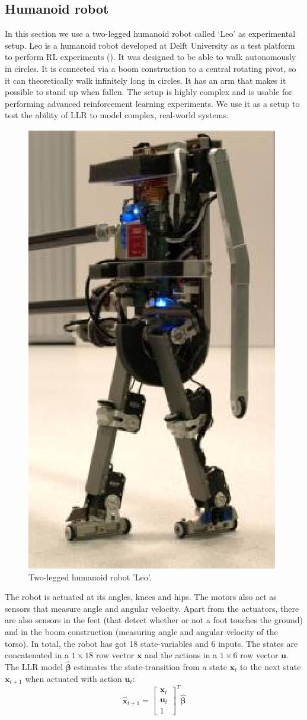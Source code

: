 \subsection{Humanoid robot}\label{sec:LLR-robot leo}
In this section we use a two-legged humanoid robot called `Leo' as experimental setup. Leo is a humanoid robot developed at Delft University as a test platform to perform \ac{RL} experiments (). It was designed to be able to walk autonomously in circles. It is connected via a boom construction to a central rotating pivot, so it can theoretically walk infinitely long in circles. It has an arm that makes it possible to stand up when fallen. The setup is highly complex and is usable for performing advanced reinforcement learning experiments. We use it as a setup to test the ability of \ac{LLR} to model complex, real-world systems.
\begin{figure}[htbp]
	\centering
		\includegraphics[width=.2\textwidth]{img/leo1}
	\caption[Humanoid robot setup]{Two-legged humanoid robot 'Leo'.}
	\label{fig:LLR-Leo}
\end{figure}
The robot is actuated at its angles, knees and hips. The motors also act as sensors that measure angle and angular velocity. Apart from the actuators, there are also sensors in the feet (that detect whether or not a foot touches the ground) and in the boom construction (measuring angle and angular velocity of the torso). In total, the robot has got 18 state-variables and 6 inputs. The states are concatenated in a $1\times 18$ row vector $\mathbf{x}$ and the actions in a $1\times 6$ row vector $\mathbf{u}$. The \ac{LLR} model $\hat{\bm{\beta}}$ estimates the state-transition from a state $\mathbf{x}_t$ to the next state $\mathbf{x}_{t+1}$ when actuated with action $\mathbf{u}_t$: 
$$
	\hat{\mathbf{x}}_{t+1} = \begin{bmatrix} \mathbf{x}_t \\ \mathbf{u}_t \\ 1 \end{bmatrix}^T \hat{\bm{\beta}}
$$

